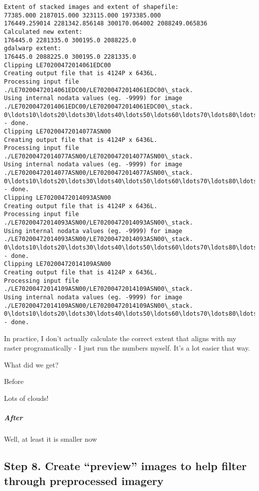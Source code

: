 \documentclass{article}
\begin{document}
    \begin{Verbatim}[commandchars=\\\{\}]
Extent of stacked images and extent of shapefile:
77385.000 2187015.000 323115.000 1973385.000
176449.259014 2281342.856148 300170.064002 2088249.065836
Calculated new extent:
176445.0 2281335.0 300195.0 2088225.0
gdalwarp extent:
176445.0 2088225.0 300195.0 2281335.0
Clipping LE70200472014061EDC00
Creating output file that is 4124P x 6436L.
Processing input file ./LE70200472014061EDC00/LE70200472014061EDC00\_stack.
Using internal nodata values (eg. -9999) for image ./LE70200472014061EDC00/LE70200472014061EDC00\_stack.
0\ldots10\ldots20\ldots30\ldots40\ldots50\ldots60\ldots70\ldots80\ldots90\ldots100 - done.
Clipping LE70200472014077ASN00
Creating output file that is 4124P x 6436L.
Processing input file ./LE70200472014077ASN00/LE70200472014077ASN00\_stack.
Using internal nodata values (eg. -9999) for image ./LE70200472014077ASN00/LE70200472014077ASN00\_stack.
0\ldots10\ldots20\ldots30\ldots40\ldots50\ldots60\ldots70\ldots80\ldots90\ldots100 - done.
Clipping LE70200472014093ASN00
Creating output file that is 4124P x 6436L.
Processing input file ./LE70200472014093ASN00/LE70200472014093ASN00\_stack.
Using internal nodata values (eg. -9999) for image ./LE70200472014093ASN00/LE70200472014093ASN00\_stack.
0\ldots10\ldots20\ldots30\ldots40\ldots50\ldots60\ldots70\ldots80\ldots90\ldots100 - done.
Clipping LE70200472014109ASN00
Creating output file that is 4124P x 6436L.
Processing input file ./LE70200472014109ASN00/LE70200472014109ASN00\_stack.
Using internal nodata values (eg. -9999) for image ./LE70200472014109ASN00/LE70200472014109ASN00\_stack.
0\ldots10\ldots20\ldots30\ldots40\ldots50\ldots60\ldots70\ldots80\ldots90\ldots100 - done.
    \end{Verbatim}

    In practice, I don't actually calculate the correct extent that aligns
with my raster programatically - I just run the numbers myself. It's a
lot easier that way.

What did we get?

Before

Lots of clouds!

\subparagraph{After}

Well, at least it is smaller now

    \subsection{Step 8. Create ``preview'' images to help filter through
preprocessed imagery}
\end{document}
